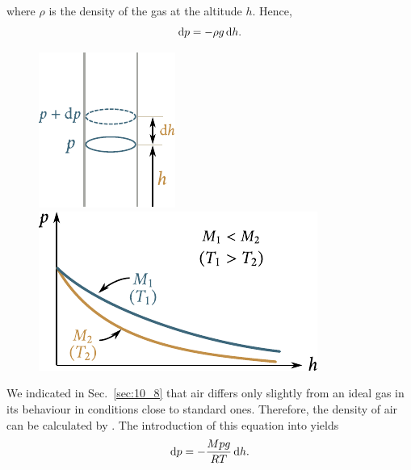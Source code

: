 \noindent
where $\rho$ is the density of the gas at the altitude $h$. Hence,
\begin{equation}\label{eq:10_68}
	\mathrm{d} p = -\rho g\,\mathrm{d} h.
\end{equation}

\begin{figure}[t]
	\begin{minipage}[t]{0.4\linewidth}
		\begin{center}
			\includegraphics[scale=1.0]{figures/ch_10/fig_10_7.pdf}
			\caption[]{}
			\label{fig:10_7}
		\end{center}
	\end{minipage}
	\hspace{-0.05cm}
	\begin{minipage}[t]{0.5\linewidth}
		\begin{center}
			\includegraphics[scale=1.0]{figures/ch_10/fig_10_8.pdf}
			\caption[]{}
			\label{fig:10_8}
		\end{center}
	\end{minipage}
	\vspace{-0.4cm}
\end{figure}

We indicated in Sec.~\ref{sec:10_8} that air differs only slightly from an ideal gas in its behaviour in conditions close to standard ones. Therefore, the density of air can be calculated by . The introduction of this equation into  yields
\vspace{-12pt}
\begin{equation}\label{eq:10_69}
	\mathrm{d} p = -\frac{Mpg}{RT}\,\mathrm{d} h.
\end{equation}

